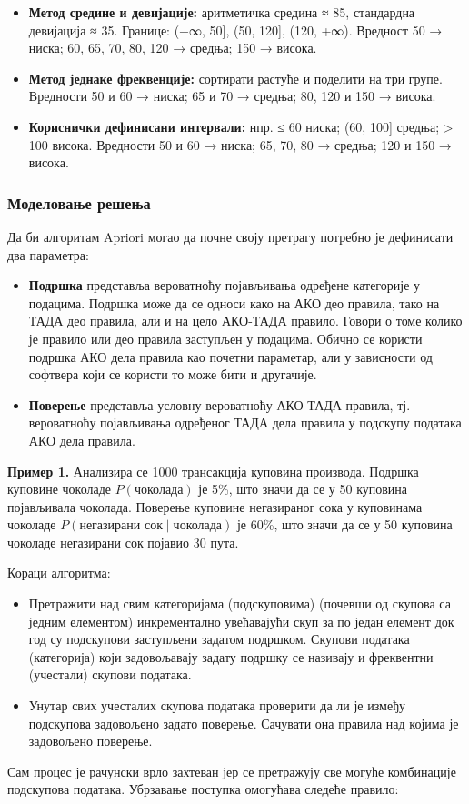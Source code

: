 \begin{itemize}
  \item \textbf{Метод средине и девијације:} аритметичка средина ≈ 85, стандардна девијација ≈ 35. Границе: (−∞, 50], (50, 120], (120, +∞). Вредност 50 → ниска; 60, 65, 70, 80, 120 → средња; 150 → висока.
  \item \textbf{Метод једнаке фреквенције:} сортирати растуће и поделити на три групе. Вредности 50 и 60 → ниска; 65 и 70 → средња; 80, 120 и 150 → висока.
  \item \textbf{Кориснички дефинисани интервали:} нпр. ≤ 60 ниска; (60, 100] средња; > 100 висока. Вредности 50 и 60 → ниска; 65, 70, 80 → средња; 120 и 150 → висока.
\end{itemize}

\subsubsection{Моделовање решења}
Да би алгоритам Apriori могао да почне своју претрагу потребно је дефинисати два параметра:

\begin{itemize}
  \item \textbf{Подршка} представља вероватноћу појављивања одређене категорије у подацима. Подршка може да се односи како на АКО део правила, тако на ТАДА део правила, али и на цело АКО-ТАДА правило. Говори о томе колико је правило или део правила заступљен у подацима. Обично се користи подршка АКО дела правила као почетни параметар, али у зависности од софтвера који се користи то може бити и другачије.
  \item \textbf{Поверење} представља условну вероватноћу АКО-ТАДА правила, тј. вероватноћу појављивања одређеног ТАДА дела правила у подскупу података АКО дела правила.
\end{itemize}
\textbf{Пример 1.} Анализира се 1000 трансакција куповина производа. Подршка куповине чоколаде $P(\textrm{чоколада})$ је 5\%, што значи да се у 50 куповина појављивала чоколада. Поверење куповине негазираног сока у куповинама чоколаде $P(\textrm{негазирани сок} \mid \textrm{чоколада})$ је 60\%, што значи да се у 50 куповина чоколаде негазирани сок појавио 30 пута.

Кораци алгоритма:

\begin{itemize}
  \item Претражити над свим категоријама (подскуповима) (почевши од скупова са једним елементом) инкрементално увећавајући скуп за по један елемент док год су подскупови заступљени задатом подршком. Скупови података (категорија) који задовољавају задату подршку се називају и фреквентни (учестали) скупови података.
  \item Унутар свих учесталих скупова података проверити да ли је између подскупова задовољено задато поверење. Сачувати она правила над којима је задовољено поверење.
\end{itemize}
Сам процес је рачунски врло захтеван јер се претражују све могуће комбинације подскупова података. Убрзавање поступка омогућава следеће правило:

